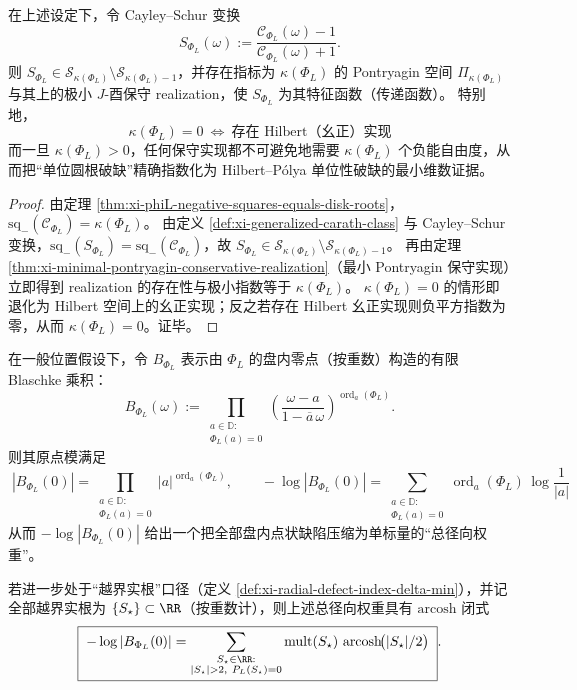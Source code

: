 \begin{corollary}\label{cor:xi-phiL-pontryagin-realization-index}
在上述设定下，令 Cayley--Schur 变换
\[
S_{\Phi_L}(\omega):=\frac{\mathscr{C}_{\Phi_L}(\omega)-1}{\mathscr{C}_{\Phi_L}(\omega)+1}.
\]
则 \(S_{\Phi_L}\in\mathcal{S}_{\kappa(\Phi_L)}\setminus\mathcal{S}_{\kappa(\Phi_L)-1}\)，并存在指标为 \(\kappa(\Phi_L)\) 的 Pontryagin 空间 \(\Pi_{\kappa(\Phi_L)}\) 与其上的极小 \(J\)-酉保守 realization，使 \(S_{\Phi_L}\) 为其特征函数（传递函数）。
特别地，
\[
\boxed{\;
\kappa(\Phi_L)=0\ \Longleftrightarrow\ \text{存在 Hilbert（幺正）实现}\;}
\]
而一旦 \(\kappa(\Phi_L)>0\)，任何保守实现都不可避免地需要 \(\kappa(\Phi_L)\) 个负能自由度，从而把“单位圆根破缺”精确指数化为 Hilbert--P{\'o}lya 单位性破缺的最小维数证据。
\end{corollary}

\begin{proof}
由定理 \ref{thm:xi-phiL-negative-squares-equals-disk-roots}，\(\mathrm{sq}_-(\mathscr{C}_{\Phi_L})=\kappa(\Phi_L)\)。
由定义 \ref{def:xi-generalized-carath-class} 与 Cayley--Schur 变换，\(\mathrm{sq}_-(S_{\Phi_L})=\mathrm{sq}_-(\mathscr{C}_{\Phi_L})\)，故 \(S_{\Phi_L}\in\mathcal{S}_{\kappa(\Phi_L)}\setminus\mathcal{S}_{\kappa(\Phi_L)-1}\)。
再由定理 \ref{thm:xi-minimal-pontryagin-conservative-realization}（最小 Pontryagin 保守实现）立即得到 realization 的存在性与极小指数等于 \(\kappa(\Phi_L)\)。
\(\kappa(\Phi_L)=0\) 的情形即退化为 Hilbert 空间上的幺正实现；反之若存在 Hilbert 幺正实现则负平方指数为零，从而 \(\kappa(\Phi_L)=0\)。证毕。
\end{proof}

\begin{proposition}\label{prop:xi-phiL-defect-weight-blaschke-origin}
在一般位置假设下，令 \(B_{\Phi_L}\) 表示由 \(\Phi_L\) 的盘内零点（按重数）构造的有限 Blaschke 乘积：
\[
B_{\Phi_L}(\omega):=\prod_{\substack{a\in\mathbb{D}:\\ \Phi_L(a)=0}}
\left(\frac{\omega-a}{1-\overline a\,\omega}\right)^{\operatorname{ord}_a(\Phi_L)}.
\]
则其原点模满足
\[
\boxed{\;
|B_{\Phi_L}(0)|
=\prod_{\substack{a\in\mathbb{D}:\\ \Phi_L(a)=0}}|a|^{\operatorname{ord}_a(\Phi_L)},\qquad
-\log|B_{\Phi_L}(0)|
=\sum_{\substack{a\in\mathbb{D}:\\ \Phi_L(a)=0}}\operatorname{ord}_a(\Phi_L)\,\log\frac{1}{|a|}\;}
\]
从而 \(-\log|B_{\Phi_L}(0)|\) 给出一个把全部盘内点状缺陷压缩为单标量的“总径向权重”。
\par
若进一步处于“越界实根”口径（定义 \ref{def:xi-radial-defect-index-delta-min}），并记全部越界实根为 \(\{S_\star\}\subset\RR\)（按重数计），则上述总径向权重具有 \(\mathrm{arcosh}\) 闭式
\[
\boxed{\;
-\log|B_{\Phi_L}(0)|
=\sum_{\substack{S_\star\in\RR:\\ |S_\star|>2,\ P_L(S_\star)=0}}
\mathrm{mult}(S_\star)\,\operatorname{arcosh}\!\bigl(|S_\star|/2\bigr)\; }.
\]
\end{proposition}

